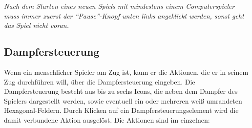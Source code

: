 \documentclass[12pt,a4paper, ngerman, oneside]{scrartcl}
\begin{document}
\emph{Nach dem Starten eines neuen Spiels mit mindestens einem Computerspieler
  muss immer zuerst der ``Pause''-Knopf unten links angeklickt werden, sonst
  geht das Spiel nicht voran.}

\subsection{Dampfersteuerung}

Wenn ein menschlicher Spieler am Zug ist, kann er die Aktionen, die er in seinem
Zug durchführen will, über die Dampfersteuerung eingeben. Die Dampfersteuerung
besteht aus bis zu sechs Icons, die neben dem Dampfer des Spielers dargestellt
werden, sowie eventuell ein oder mehreren weiß umrandeten Hexagonal-Feldern.
Durch Klicken auf ein Dampfersteuerungselement wird die damit verbundene Aktion
ausgelöst. Die Aktionen sind im einzelnen:
\end{document}
